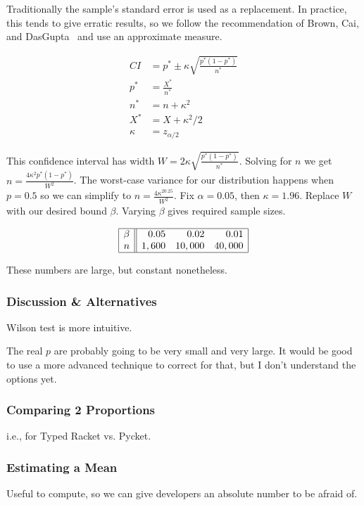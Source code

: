 \documentclass{article}
\begin{document}
Traditionally the sample's standard error is used as a replacement.
In practice, this tends to give erratic results, so we follow the recommendation of Brown, Cai, and DasGupta~\cite{todo} and use an approximate measure.

\begin{align*}
  CI &= p^* \pm \kappa\sqrt{\frac{p^*(1 - p^*)}{n^*}}
\\p^* &= \frac{X^*}{n^*}
\\n^* &= n + \kappa^2
\\X^* &= X + \kappa^2 / 2
\\\kappa &= z_{\alpha / 2}
\end{align*}

This confidence interval has width $W = 2\kappa\sqrt{\frac{p^*(1-p^*)}{n^*}}$.
Solving for $n$ we get $n = \frac{4\kappa^2p^*(1-p^*)}{W^2}$.
The worst-case variance for our distribution happens when $p=0.5$ so we can simplify to $n = \frac{4\kappa^20.25}{W^2}$.
Fix $\alpha = 0.05$, then $\kappa = 1.96$.
Replace $W$ with our desired bound $\beta$.
Varying $\beta$ gives required sample sizes.

\[\begin{array}{| r || r r r |}\hline
  \beta & 0.05  & 0.02   & 0.01 \\
  n     & 1,600 & 10,000 & 40,000 \\\hline
  \end{array}\]

These numbers are large, but constant nonetheless.


\subsubsection{Discussion \& Alternatives}
Wilson test is more intuitive.

The real $p$ are probably going to be very small and very large.
It would be good to use a more advanced technique to correct for that, but I don't understand the options yet.

\subsubsection{Comparing 2 Proportions}
i.e., for Typed Racket vs. Pycket.

\subsubsection{Estimating a Mean}
Useful to compute, so we can give developers an absolute number to be afraid of.
\end{document}
